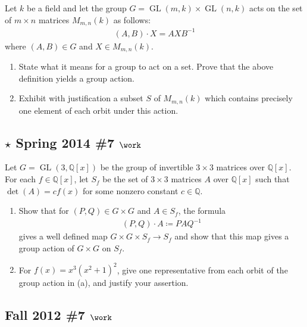 Let \(k\) be a field and let the group
\(G = \operatorname{GL}(m, k) \times\operatorname{GL}(n, k)\) acts on
the set of \(m\times n\) matrices \(M_{m, n}(k)\) as follows:
\begin{align*}
(A, B) \cdot X = AXB^{-1}
\end{align*}
where \((A, B) \in G\) and \(X\in M_{m, n}(k)\).

\begin{enumerate}
\def\labelenumi{\alph{enumi}.}
\item
  State what it means for a group to act on a set. Prove that the above
  definition yields a group action.
\item
  Exhibit with justification a subset \(S\) of \(M_{m, n}(k)\) which
  contains precisely one element of each orbit under this action.
\end{enumerate}

\hypertarget{star-spring-2014-7-work}{%
\subsection{\texorpdfstring{\(\star\) Spring 2014 \#7
\(\work\)}{\textbackslash star Spring 2014 \#7 \textbackslash work}}\label{star-spring-2014-7-work}}

Let \(G = \operatorname{GL}(3, {\mathbb{Q}}[x])\) be the group of
invertible \(3\times 3\) matrices over \({\mathbb{Q}}[x]\). For each
\(f\in {\mathbb{Q}}[x]\), let \(S_f\) be the set of \(3\times 3\)
matrices \(A\) over \({\mathbb{Q}}[x]\) such that
\(\operatorname{det}(A) = c f(x)\) for some nonzero constant
\(c\in {\mathbb{Q}}\).

\begin{enumerate}
\def\labelenumi{\alph{enumi}.}
\item
  Show that for \((P, Q) \in G\times G\) and \(A\in S_f\), the formula
  \begin{align*}
  (P, Q)\cdot A \coloneqq PAQ^{-1}
  \end{align*}
  gives a well defined map \(G\times G \times S_f \to S_f\) and show
  that this map gives a group action of \(G\times G\) on \(S_f\).
\item
  For \(f(x) = x^3(x^2+1)^2\), give one representative from each orbit
  of the group action in (a), and justify your assertion.
\end{enumerate}

\hypertarget{fall-2012-7-work}{%
\subsection{\texorpdfstring{Fall 2012 \#7
\(\work\)}{Fall 2012 \#7 \textbackslash work}}\label{fall-2012-7-work}}

